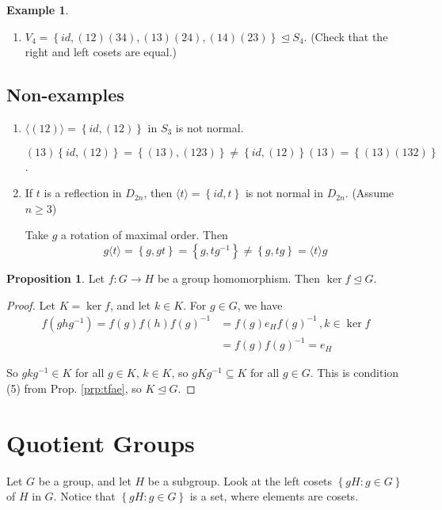 \documentclass{article}
\theoremstyle{definition}
\newtheorem{proposition}[theorem]{Proposition}
\newtheorem*{exmp}{Example}
\newcommand{\gene}[1]{\langle #1 \rangle}
\newcommand{\func}[3]{#1 : #2 \rightarrow #3}
\begin{document}
\begin{exmp}
\begin{enumerate}
\item $V_4 = \left\{ id,(12)(34), (13)(24),(14)(23) \right\} \trianglelefteq S_4$. (Check that the right and left cosets are equal.)
  \end{enumerate}
\end{exmp}

\subsection*{Non-examples}
\begin{enumerate}
  \item $\gene{(12)}=\left\{ id,(12) \right\}$ in $S_3$ is not normal.

    $(13)\left\{ id, (12) \right\}=\left\{ (13),(123) \right\} \neq \left\{ id,(12) \right\}(13) = \left\{ (13)(132) \right\}$.

  \item If $t$ is a reflection in $D_{2n}$, then $\gene{t}=\left\{ id,t \right\}$ is not normal in $D_{2n}$. (Assume $n \geq 3$)

    Take $g$ a rotation of maximal order. Then 
    $$g\gene{t}=\left\{ g,gt \right\}=\left\{g,tg^{-1}\right\}\neq \left\{ g,tg \right\}=\gene{t}g$$
\end{enumerate}

\begin{proposition}
  Let $\func{f}{G}{H}$ be a group homomorphism. Then $\ker f \trianglelefteq G$. 
\end{proposition}

\begin{proof}
  Let $K = \ker f$, and let $k \in K$. For $g \in G$, we have 
  \begin{align*}
  f(ghg^{-1})=f(g)f(h)f(g)^{-1} &= f(g)e_Hf(g)^{-1} \,, k \in \ker f\\ &= f(g)f(g)^{-1} = e_H
  \end{align*}

  So $gkg^{-1} \in K$ for all $g \in K$, $k \in K$, so $gKg^{-1} \subseteq K$ for all $g \in G$. This is condition (5) from Prop. \ref{prp:tfae}, so $K \trianglelefteq G$.
\end{proof}

\section{Quotient Groups}
Let $G$ be a group, and let $H$ be a subgroup. Look at the left cosets $\left\{ gH:g\in G \right\}$ of $H$ in $G$. Notice that $\left\{ gH:g\in G \right\}$ is a set, where elements are cosets.
\end{document}

